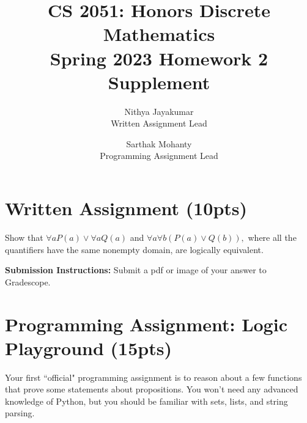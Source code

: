 \documentclass{article}
\title{\vspace{-1cm}CS 2051: Honors Discrete Mathematics \\Spring 2023 Homework 2 Supplement}
\author{Nithya Jayakumar \\ \small{Written Assignment Lead}
\and Sarthak Mohanty \\ \small{Programming Assignment Lead}}
\date{}
\begin{document}
\maketitle

\section*{Written Assignment (10pts)}
    Show that $\forall a P(a) \lor \forall a Q(a)$ and $\forall a \forall b (P(a) \lor Q(b)),$ where all the quantifiers have the same nonempty domain, are logically equivalent.

    \vspace{3mm}
    \textbf{Submission Instructions:} 
    Submit a pdf or image of your answer to Gradescope.


\section*{Programming Assignment: Logic Playground (15pts)}

    Your first ``official" programming assignment is to reason about a few functions that prove some statements about propositions. You won't need any advanced knowledge of Python, but you should be familiar with sets, lists, and string parsing.
\end{document}
